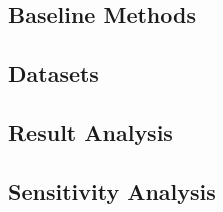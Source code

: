 \subsection{Baseline Methods}
\subsection{Datasets}
\subsection{Result Analysis}
\subsection{Sensitivity Analysis}